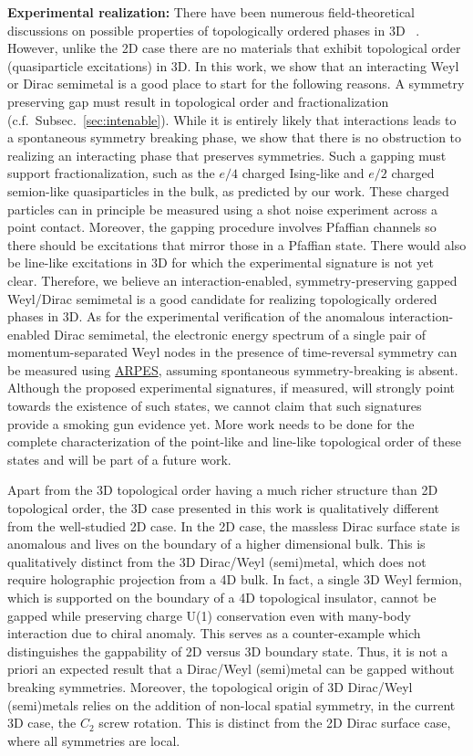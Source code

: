 \textbf{Experimental realization:} There have been numerous field-theoretical discussions on possible properties of topologically ordered phases in 3D ~\cite{BiYouXu14,JiangMesarosRan14,WangLevin14,JianQi14,WangWen15,WangLevin15,LinLevin15,ChenTiwariRyu15}. However, unlike the 2D case there are no materials that exhibit topological order (quasiparticle excitations) in 3D. In this work, we show that an interacting Weyl or Dirac semimetal is a good place to start for the following reasons. A symmetry preserving gap must result in topological order and fractionalization (c.f.~Subsec.~\ref{sec:intenable}). While it is entirely likely that interactions leads to a spontaneous symmetry breaking phase, we show that there is no obstruction to realizing an interacting phase that preserves symmetries. Such a gapping must support fractionalization, such as the $e/4$ charged Ising-like and $e/2$ charged semion-like quasiparticles in the bulk, as predicted by our work. These charged particles can in principle be measured using a shot noise experiment across a point contact. Moreover, the gapping procedure involves Pfaffian channels so there should be excitations that mirror those in a Pfaffian state. There would also be line-like excitations in 3D for which the experimental signature is not yet clear. Therefore, we believe an interaction-enabled, symmetry-preserving gapped Weyl/Dirac semimetal is a good candidate for realizing topologically ordered phases in 3D. As for the experimental verification of the anomalous interaction-enabled Dirac semimetal, the electronic energy spectrum of a single pair of momentum-separated Weyl nodes in the presence of time-reversal symmetry can be measured using \hyperlink{ARPES}{ARPES}, assuming spontaneous symmetry-breaking is absent. Although the proposed experimental signatures, if measured, will strongly point towards the existence of such states, we cannot claim that such signatures provide a smoking gun evidence yet. More work needs to be done for the complete characterization of the point-like and line-like topological order of these states and will be part of a future work.

Apart from the 3D topological order having a much richer structure than 2D topological order, the 3D case presented in this work is qualitatively different from the well-studied 2D case. In the 2D case, the massless Dirac surface state is anomalous and lives on the boundary of a higher dimensional bulk. This is qualitatively distinct from the 3D Dirac/Weyl (semi)metal, which does not require holographic projection from a 4D bulk. In fact, a single 3D Weyl fermion, which is supported on the boundary of a 4D topological insulator, cannot be gapped while preserving charge U(1) conservation even with many-body interaction due to chiral anomaly. This serves as a counter-example which distinguishes the gappability of 2D versus 3D boundary state. Thus, it is not a priori an expected result that a Dirac/Weyl (semi)metal can be gapped without breaking symmetries. Moreover, the topological origin of 3D Dirac/Weyl (semi)metals relies on the addition of non-local spatial symmetry, in the current 3D case, the $C_2$ screw rotation. This is distinct from the 2D Dirac surface case, where all symmetries are local.


